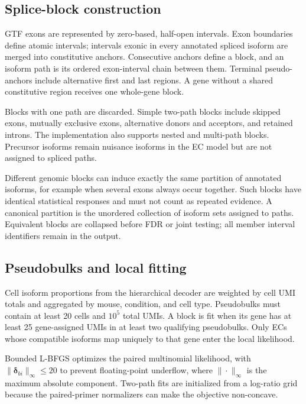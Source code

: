 \documentclass[11pt]{article}
\begin{document}
\subsection*{Splice-block construction}

GTF exons are represented by zero-based, half-open intervals. Exon boundaries define atomic intervals; intervals exonic in every annotated spliced isoform are merged into constitutive anchors. Consecutive anchors define a block, and an isoform path is its ordered exon-interval chain between them. Terminal pseudo-anchors include alternative first and last regions. A gene without a shared constitutive region receives one whole-gene block.

Blocks with one path are discarded. Simple two-path blocks include skipped exons, mutually exclusive exons, alternative donors and acceptors, and retained introns. The implementation also supports nested and multi-path blocks. Precursor isoforms remain nuisance isoforms in the EC model but are not assigned to spliced paths.

Different genomic blocks can induce exactly the same partition of annotated isoforms, for example when several exons always occur together. Such blocks have identical statistical responses and must not count as repeated evidence. A canonical partition is the unordered collection of isoform sets assigned to paths. Equivalent blocks are collapsed before FDR or joint testing; all member interval identifiers remain in the output.

\subsection*{Pseudobulks and local fitting}

Cell isoform proportions from the hierarchical decoder are weighted by cell UMI totals and aggregated by mouse, condition, and cell type. Pseudobulks must contain at least 20 cells and \(10^5\) total UMIs. A block is fit when its gene has at least 25 gene-assigned UMIs in at least two qualifying pseudobulks. Only ECs whose compatible isoforms map uniquely to that gene enter the local likelihood.

Bounded L-BFGS optimizes the paired multinomial likelihood, with \(\|\bm\delta_{bi}\|_\infty\leq20\) to prevent floating-point underflow, where \(\|\cdot\|_\infty\) is the maximum absolute component. Two-path fits are initialized from a log-ratio grid because the paired-primer normalizers can make the objective non-concave.
\end{document}
